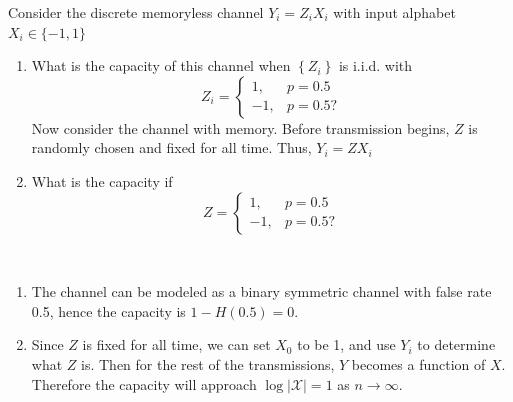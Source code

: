\begin{exercise}{ Consider the discrete memoryless channel $Y_{i}=Z_{i} X_{i}$ with input alphabet $X_{i} \in\{-1,1\}$
  \begin{enumerate}
    \item What is the capacity of this channel when $\left\{Z_{i}\right\}$ is i.i.d. with
    $$
    Z_{i}=\left\{\begin{aligned}
    1, & p=0.5 \\
    -1, & p=0.5 ?
    \end{aligned}\right.
    $$
    Now consider the channel with memory. Before transmission begins, $Z$ is randomly chosen and fixed for all time. Thus, $Y_{i}=Z X_{i}$
    \item  What is the capacity if
    $$
    Z=\left\{\begin{aligned}
    1, & p=0.5 \\
    -1, & p=0.5 ?
    \end{aligned}\right.
    $$
  \end{enumerate}  }
  \begin{solution}
  \par{~}
  \begin{enumerate}
    \item { The channel can be modeled as a binary symmetric channel with false rate 0.5, hence the capacity is $1-H(0.5) = 0$.}
    \item { Since $Z$ is fixed for all time, we can set $X_0$ to be 1, and use $Y_i$ to determine what $Z$ is. Then for the rest of the transmissions, $Y$ becomes a function of $X$. Therefore the capacity will approach $\log |\mathcal{X}| = 1$ as $n \rightarrow \infty$. }
  \end{enumerate}
  \end{solution}
  \label{ex7-8}
\end{exercise}

